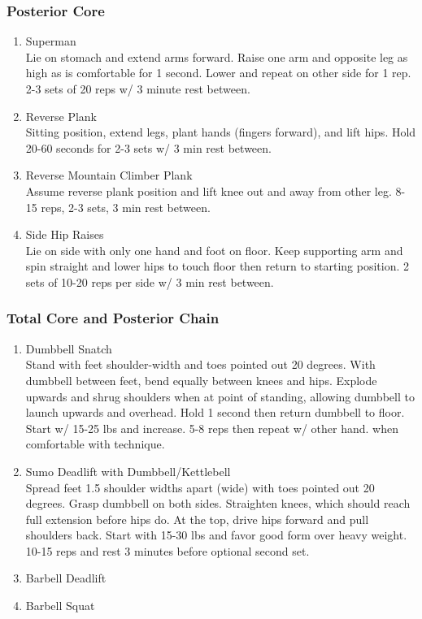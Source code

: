 \documentclass[12pt, letterpaper]{article}
\begin{document}
\subsubsection{Posterior Core}

\begin{enumerate}

    \item Superman\\ 
          Lie on stomach and extend arms forward. Raise one arm and opposite leg as high as is comfortable for 1 second.
          Lower and repeat on other side for 1 rep. 2-3 sets of 20 reps w/ 3 minute rest between.
    \item Reverse Plank\\ 
          Sitting position, extend legs, plant hands (fingers forward), and lift hips. Hold 20-60 seconds for 2-3 sets 
          w/ 3 min rest between.
    \item Reverse Mountain Climber Plank\\ 
          Assume reverse plank position and lift knee out and away from other leg. 8-15 reps, 2-3 sets, 3 min rest between.
    \item Side Hip Raises\\ 
          Lie on side with only one hand and foot on floor. Keep supporting arm and spin straight and lower hips to touch floor
          then return to starting position. 2 sets of 10-20 reps per side w/ 3 min rest between.
\end{enumerate}

\subsubsection{Total Core and Posterior Chain}

\begin{enumerate}

    \item Dumbbell Snatch\\ 
          Stand with feet shoulder-width and toes pointed out 20 degrees. With dumbbell between feet, bend equally between knees and hips. 
          Explode upwards and shrug shoulders when at point of standing, allowing dumbbell to launch upwards and overhead. 
          Hold 1 second then return dumbbell to floor. Start w/ 15-25 lbs and increase. 5-8 reps then repeat w/ other hand. 
          when comfortable with technique.
    \item Sumo Deadlift with Dumbbell/Kettlebell\\ 
          Spread feet 1.5 shoulder widths apart (wide) with toes pointed out 20 degrees. Grasp dumbbell on both sides. 
          Straighten knees, which should reach full extension before hips do. At the top, drive hips forward and pull
          shoulders back. Start with 15-30 lbs and favor good form over heavy weight. 
          10-15 reps and rest 3 minutes before optional second set.
    \item Barbell Deadlift \\ 
    \item Barbell Squat \\ 
    
\end{enumerate}
\end{document}
